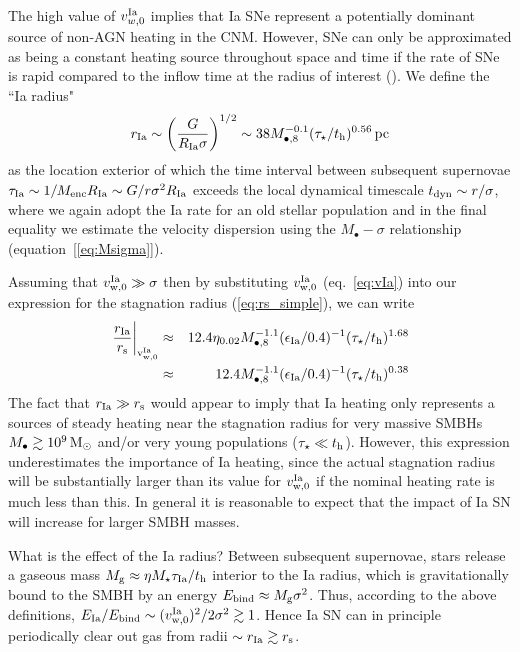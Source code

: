 \documentclass[usenatbib,fleqn]{mn2e}
\begin{document}
The high value of $v_{w,0}^{\rm Ia}$ implies that Ia SNe represent a potentially dominant source of non-AGN heating in the CNM.  However, SNe can only be approximated as being a constant heating source throughout space and time if the rate of SNe is rapid compared to the inflow time at the radius of interest (\citealt{ShcherbakovWong+:2014a}).  We define the ``Ia radius"
  \begin{align}
    r_{\rm Ia} \sim \left(\frac{G}{R_{\rm Ia}\sigma}\right)^{1/2} \sim
    38 M_{\bullet,8}^{-0.1}(\tau_{\star}/t_{\rm h})^{0.56}\,{\rm pc}
    \label{eq:rIa}
  \end{align}
as the location exterior of which the time interval between subsequent supernovae $\tau_{\rm Ia} \sim 1/M_{\rm enc}R_{\rm Ia} \sim G/r\sigma^{2}R_{\rm Ia}$ exceeds the local dynamical timescale $t_{\rm
dyn} \sim r/\sigma$, where we again adopt the Ia rate for an old stellar population and in the final equality we estimate the velocity dispersion using the $M_{\bullet}-\sigma$ relationship
(equation~[\ref{eq:Msigma}]).  

Assuming that $v_{\rm w,0}^{\rm Ia} \gg \sigma$ then by substituting $v_{\rm w,0}^{\rm Ia}$ (eq.~\ref{eq:vIa}) into our expression for the stagnation radius (\ref{eq:rs_simple}), we can write
\begin{eqnarray}
\left.\frac{r_{\rm Ia}}{r_{\rm s}}\right|_{\rm v_{w,0}^{\rm Ia}} &\approx& 12.4\eta_{0.02} M_{\bullet,8}^{-1.1}(\epsilon_{\rm Ia}/0.4)^{-1}(\tau_{\star}/t_{\rm h})^{1.68} \nonumber \\
&\approx& 12.4M_{\bullet,8}^{-1.1}(\epsilon_{\rm Ia}/0.4)^{-1}(\tau_{\star}/t_{\rm h})^{0.38}
\end{eqnarray}
The fact that $r_{\rm Ia} \gg r_{\rm s}$ would appear to imply that Ia heating only represents a sources of steady heating near the stagnation radius for very massive SMBHs $M_{\bullet} \gtrsim 10^9 \,{\rm M_\odot}$ and/or very young populations ($\tau_{\star} \ll t_{\rm h}$).  However, this expression underestimates the importance of Ia heating, since the actual stagnation radius will be substantially larger than its value for $v_{\rm w,0}^{\rm Ia}$ if the nominal heating rate is much less than this.  In general it is reasonable to expect that the impact of Ia SN will increase for larger SMBH masses.

What is the effect of the Ia radius?  Between subsequent supernovae, stars release a gaseous mass $M_{\rm g} \approx \eta M_{\star}\tau_{\rm Ia}/t_{\rm h}$ interior to the Ia radius, which is gravitationally bound to the SMBH by an energy $E_{\rm bind} \approx M_{\rm g}\sigma^{2}$.  Thus, according to the above definitions, $E_{\rm Ia}/E_{\rm bind} \sim (v_{\rm w,0}^{\rm Ia})^{2}/2\sigma^{2} \gtrsim 1$.  Hence Ia SN can in principle periodically clear out gas from radii $\sim r_{\rm Ia} \gtrsim r_{\rm s}$. 
\end{document}
